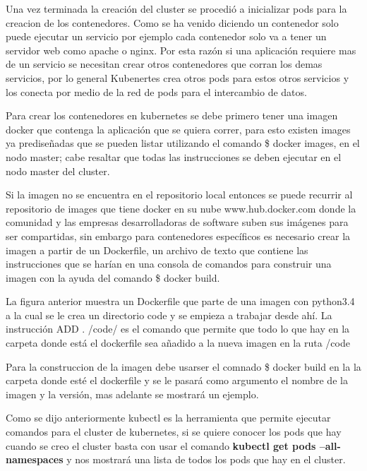       Una vez terminada la creación del cluster se procedió a inicializar pods para la creacion de los contenedores. Como se ha venido diciendo un contenedor solo puede ejecutar un servicio por ejemplo cada contenedor solo va a tener un servidor web como apache o nginx.
     Por esta razón si una aplicación requiere mas de un servicio se necesitan crear otros contenedores que corran los demas servicios, por lo general Kubenertes crea otros pods para estos otros servicios y los conecta por medio de la red de pods para el intercambio de datos.
     
     Para crear los contenedores en kubernetes se debe primero tener una imagen docker que contenga la aplicación que se quiera correr, para esto existen images ya prediseñadas que se pueden listar utilizando el comando \$ docker images, en el nodo master; cabe resaltar que todas las instrucciones se deben ejecutar en el nodo master del cluster. 
     
     
     
     
     Si la imagen no se encuentra en el repositorio local entonces se puede recurrir al repositorio de images que tiene docker en su nube www.hub.docker.com donde la comunidad y las empresas desarrolladoras de software suben sus imágenes para ser compartidas, sin embargo para contenedores específicos es necesario crear la imagen a partir de un Dockerfile, un archivo de texto que contiene las instrucciones que se harían en una consola de comandos para construir una imagen con la ayuda del comando \$ docker build.
     
     
    
      
      
      La figura anterior muestra un Dockerfile que parte de una imagen con python3.4
      a la cual se le crea un directorio code y se empieza a trabajar desde ahí.
      La instrucción ADD . /code/ es el comando que permite que todo lo que hay en la carpeta donde está el dockerfile sea añadido a la nueva imagen en la ruta /code
      
      Para la construccion de la imagen debe usarser el comnado \$ docker build en la la carpeta donde esté el dockerfile y se le pasará como argumento el nombre de la imagen y la versión, mas adelante se mostrará un ejemplo.
      
      Como se dijo anteriormente kubectl es la herramienta que permite ejecutar comandos para el cluster de kubernetes, si se quiere conocer los pods que hay cuando se creo el cluster basta con usar el comando \textbf{kubectl get pods --all-namespaces} y nos mostrará una lista de todos los pods que hay en el cluster.
      

